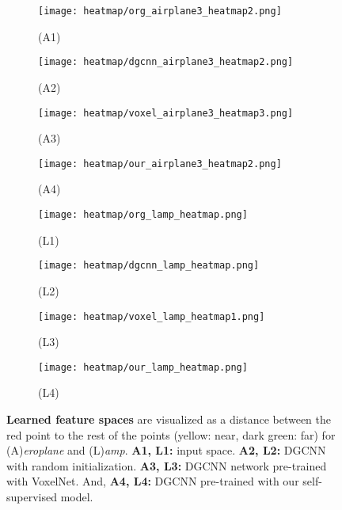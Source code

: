 \documentclass{article}
\begin{document}
\begin{figure}[h]
	\centering
    	\begin{subfigure}{.45\textwidth}
		\centering
		\texttt{[image: heatmap/org\_airplane3\_heatmap2.png]}
		\caption*{(A1)}
		\label{fig:sub13}
    \end{subfigure}\begin{subfigure}{.45\textwidth}
		\centering
		\texttt{[image: heatmap/dgcnn\_airplane3\_heatmap2.png]}
		\caption*{(A2)}
		\label{fig:sub14}
    \end{subfigure}
    \begin{subfigure}{.45\textwidth}
		\centering
		\texttt{[image: heatmap/voxel\_airplane3\_heatmap3.png]}
		\caption*{(A3)}
		\label{fig:sub15}
	\end{subfigure}\begin{subfigure}{.45\textwidth}
		\centering
		\texttt{[image: heatmap/our\_airplane3\_heatmap2.png]}
		\caption*{(A4)}
		\label{fig:sub16}
    \end{subfigure}
    	\begin{subfigure}{.45\textwidth}
		\centering
		\texttt{[image: heatmap/org\_lamp\_heatmap.png]}
		\caption*{(L1)}
		\label{fig:sub9}
	\end{subfigure}\begin{subfigure}{.45\textwidth}
		\centering
		\texttt{[image: heatmap/dgcnn\_lamp\_heatmap.png]}
		\caption*{(L2)}
		\label{fig:sub10}
    \end{subfigure}
    \begin{subfigure}{.45\textwidth}
		\centering
		\texttt{[image: heatmap/voxel\_lamp\_heatmap1.png]}
		\caption*{(L3)}
		\label{fig:sub11}
	\end{subfigure}\begin{subfigure}{.45\textwidth}
		\centering
		\texttt{[image: heatmap/our\_lamp\_heatmap.png]}
		\caption*{(L4)}
		\label{fig:sub12}
	\end{subfigure}
\caption{\textbf{Learned feature spaces} are visualized as a distance between the red point to the rest of the points (yellow: near, dark green: far) for (A)\emph{eroplane} and (L)\emph{amp}. \textbf{A1, L1:} input  space. \textbf{A2, L2:} DGCNN with random initialization. \textbf{A3, L3:} DGCNN network pre-trained with VoxelNet. And, \textbf{A4, L4:} DGCNN pre-trained with our self-supervised model.}
	\label{fig:heatmap_supp1}
\end{figure}
\end{document}
